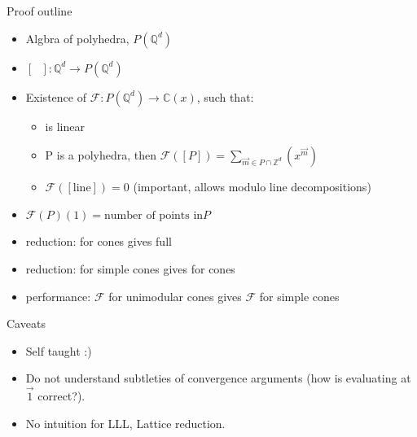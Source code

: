 \documentclass[8pt]{beamer}
\begin{document}
\begin{frame}[label=sec-5]{Proof outline}
\begin{itemize}
\item Algbra of polyhedra, $P(\mathbb{Q}^d)$
\item $[\text{ }] : \mathbb{Q}^d \rightarrow P(\mathbb{Q}^d)$
\item Existence of $\mathcal{F}: P(\mathbb{Q}^d) \rightarrow \mathbb{C}(x)$, such that:
\begin{itemize}
\item {} is linear
\item P is a polyhedra, then $\mathcal{F}([P]) = \sum_{\vec{m} \in P \cap \mathbb{Z}^d} (x^{\vec{m}} )$
\item $\mathcal{F}([\text{line}]) = 0$ (important, allows modulo line decompositions)
\end{itemize}
\item $\mathcal{F}(P)(1) = \text{number of points in} P$
\item reduction:  for cones gives full 
\item reduction:  for simple cones gives  for cones
\item performance: $\mathcal{F}$ for unimodular cones gives $\mathcal{F}$ for simple cones
\end{itemize}
\end{frame}


\begin{frame}[label=sec-6]{Caveats}
\begin{itemize}
\item Self taught :)
\item Do not understand subtleties of convergence arguments (how is evaluating at $\vec{1}$ correct?).
\item No intuition for LLL, Lattice reduction.
\end{itemize}
\end{frame}
\end{document}
